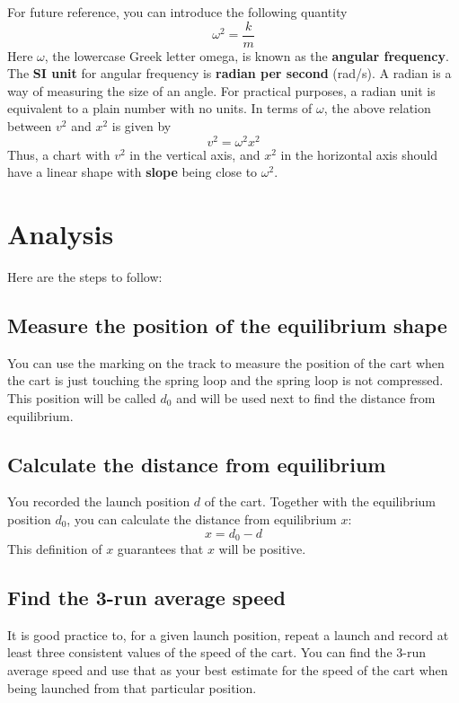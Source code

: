 For future reference, you can introduce the following quantity
\begin{equation}
    \omega^{2} = \frac{k}{m}
\end{equation}
Here $\omega$, the lowercase Greek letter omega, is known as the \textbf{angular frequency}. The \textbf{SI unit} for angular frequency is \textbf{radian per second} (rad/s). A radian is a way of measuring the size of an angle. For practical purposes, a radian unit is equivalent to a plain number with no units. In terms of $\omega$, the above relation between $v^{2}$ and $x^{2}$ is given by
\begin{equation}
    v^{2} = \omega^{2} x^{2}
\end{equation}
Thus, a chart with $v^{2}$ in the vertical axis, and $x^{2}$ in the horizontal axis should have a linear shape with \textbf{slope} being close to $\omega^{2}$.
%
\section{Analysis}
%
Here are the steps to follow:
%
\subsection{Measure the position of the equilibrium shape}
%
You can use the marking on the track to measure the position of the cart when the cart is just touching the spring loop and the spring loop is not compressed. This position will be called $d_{0}$ and will be used next to find the distance from equilibrium.
%
\subsection{Calculate the distance from equilibrium}
%
You recorded the launch position $d$ of the cart. Together with the equilibrium position $d_{0}$, you can calculate the distance from equilibrium $x$:
\begin{equation}
    x = d_{0} - d
\end{equation}
This definition of $x$ guarantees that $x$ will be positive.
%
\subsection{Find the 3-run average speed}
%
It is good practice to, for a given launch position, repeat a launch and record at least three consistent values of the speed of the cart. You can find the 3-run average speed and use that as your best estimate for the speed of the cart when being launched from that particular position.
%
